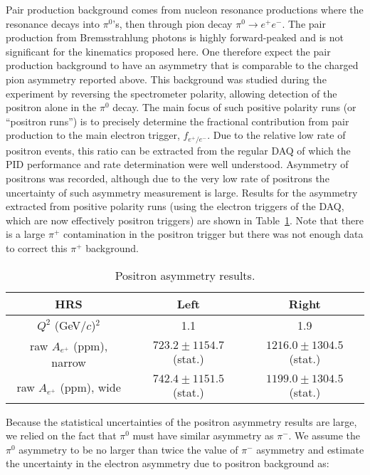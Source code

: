 Pair production background comes from nucleon resonance productions where the resonance
decays into $\pi^0$'s, then through pion decay $\pi^0\to e^+e^-$. 
The pair production from Bremsstrahlung photons is highly
forward-peaked and is not significant for the kinematics proposed here.
One therefore expect
the pair production background to have an asymmetry that is comparable to the charged
pion asymmetry reported above. This background was studied during the experiment by 
reversing the spectrometer polarity, allowing detection of the positron alone in the $\pi^0$ decay. 
The main focus of such positive polarity runs (or ``positron runs'') is to precisely
determine the fractional contribution from pair production to the main electron trigger,
$f_{e^+/e^-}$. Due to the relative low rate of positron events, this ratio can be extracted
from the regular DAQ of which the PID performance and rate determination were well understood. 
Asymmetry of positrons was recorded, although due to the very low rate of positrons the 
uncertainty of such asymmetry measurement is large. Results for the asymmetry
extracted from positive polarity runs (using the electron triggers of the DAQ, which are now
effectively positron triggers) are shown in Table~\ref{tab:Apositron}.
Note that there is a large $\pi^+$ contamination in the positron trigger but there
was not enough data to correct this $\pi^+$ background.

\begin{table}
 \caption{Positron asymmetry results.}\label{tab:Apositron}
 \begin{center}
\begin{tabular}{c|c|c}\hline
  HRS                 &{Left} & {Right}\\\hline
  $Q^2$ (GeV/$c$)$^2$ & {1.1} & {1.9}\\\hline
  raw $A_{e^+}$ (ppm), narrow & $723.2\pm 1154.7$(stat.) & $1216.0\pm 1304.5$(stat.) \\
  raw $A_{e^+}$ (ppm), wide   & $742.4\pm 1151.5$(stat.) & $1199.0\pm 1304.5$(stat.)\\\hline %
\end{tabular}
 \end{center}
\end{table}

Because the statistical uncertainties of the positron asymmetry results are large, we relied on the fact
that $\pi^0$ must have similar asymmetry as $\pi^-$. We assume the $\pi^0$ asymmetry to be no larger than twice
the value of $\pi^-$ asymmetry and estimate the uncertainty in the electron asymmetry due to positron background 
as:

